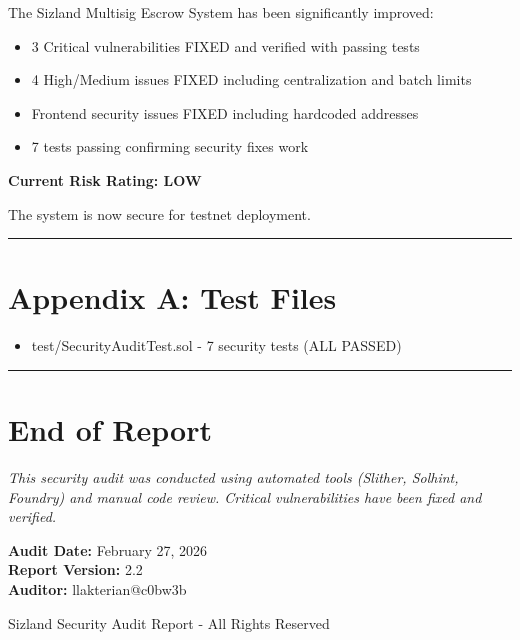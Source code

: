 \documentclass[12pt,a4paper]{article}
\begin{document}
The Sizland Multisig Escrow System has been significantly improved:

\begin{itemize}
    \item 3 Critical vulnerabilities FIXED and verified with passing tests
    \item 4 High/Medium issues FIXED including centralization and batch limits
    \item Frontend security issues FIXED including hardcoded addresses
    \item 7 tests passing confirming security fixes work
\end{itemize}

\bigskip
\textbf{Current Risk Rating: LOW}

The system is now secure for testnet deployment.

\bigskip
\hrule

\section*{Appendix A: Test Files}

\begin{itemize}
    \item test/SecurityAuditTest.sol - 7 security tests (ALL PASSED)
\end{itemize}

\bigskip
\hrule

\section*{End of Report}

\textit{This security audit was conducted using automated tools (Slither, Solhint, Foundry) and manual code review. Critical vulnerabilities have been fixed and verified.}

\bigskip
\textbf{Audit Date:} February 27, 2026 \\
\textbf{Report Version:} 2.2 \\
\textbf{Auditor:} llakterian@c0bw3b

\bigskip
\begin{center}
Sizland Security Audit Report - All Rights Reserved
\end{center}
\end{document}
